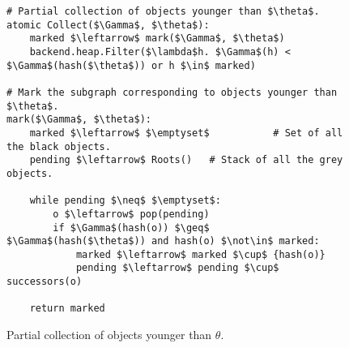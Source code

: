 \begin{figure}[!ht]
  \caption{Partial collection of objects younger than $\theta$.}
  \label{alg:partial-gen}

  \vspace{-.5em}
  \centering
  \begin{lstlisting}
# Partial collection of objects younger than $\theta$.
atomic Collect($\Gamma$, $\theta$):
    marked $\leftarrow$ mark($\Gamma$, $\theta$)
    backend.heap.Filter($\lambda$h. $\Gamma$(h) < $\Gamma$(hash($\theta$)) or h $\in$ marked)

# Mark the subgraph corresponding to objects younger than $\theta$.
mark($\Gamma$, $\theta$):
    marked $\leftarrow$ $\emptyset$           # Set of all the black objects.
    pending $\leftarrow$ Roots()   # Stack of all the grey objects.

    while pending $\neq$ $\emptyset$:
        o $\leftarrow$ pop(pending)
        if $\Gamma$(hash(o)) $\geq$ $\Gamma$(hash($\theta$)) and hash(o) $\not\in$ marked:
            marked $\leftarrow$ marked $\cup$ {hash(o)}
            pending $\leftarrow$ pending $\cup$ successors(o)

    return marked
\end{lstlisting}
\end{figure}

